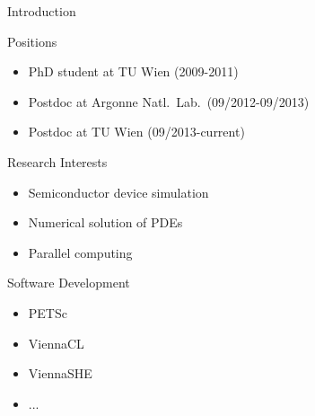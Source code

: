 

\begin{frame}{Introduction}

 \begin{minipage}{0.68\textwidth}
 \begin{block}{Positions}
   \begin{itemize}
    \item PhD student at TU Wien (2009-2011)
    \item Postdoc at Argonne Natl.~Lab.~(09/2012-09/2013)
    \item Postdoc at TU Wien (09/2013-current)
   \end{itemize}
 \end{block}

 \begin{block}{Research Interests}
   \begin{itemize}
    \item Semiconductor device simulation
    \item Numerical solution of PDEs
    \item Parallel computing
   \end{itemize}
 \end{block}

 \begin{block}{Software Development}
   \begin{itemize}
    \item PETSc
    \item ViennaCL
    \item ViennaSHE
    \item ...
   \end{itemize}
 \end{block}
 \end{minipage}
  \begin{minipage}{0.3\textwidth}
 \end{minipage}

\end{frame}



